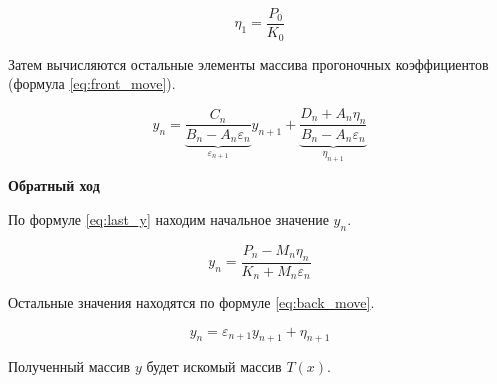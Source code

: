 \begin{equation}\label{eq:first_eta}
    \eta_1 = \frac{P_0}{K_0}
\end{equation}

Затем вычисляются остальные элементы массива прогоночных коэффициентов
(формула \ref{eq:front_move}).

\begin{equation}\label{eq:front_move}
    y_n =
    \underbrace{\frac{C_n}{B_n - A_n \varepsilon_n}}_{\varepsilon_{n+1}} y_{n+1} +
    \underbrace{\frac{D_n + A_n \eta_n}{B_n - A_n \varepsilon_n}}_{\eta_{n+1}}
\end{equation}

\textbf{Обратный ход}

По формуле \ref{eq:last_y} находим начальное значение $y_n$.

\begin{equation}\label{eq:last_y}
    y_n = \frac{P_n - M_n \eta_n}{K_n + M_n \varepsilon_n}
\end{equation}

Остальные значения находятся по формуле \ref{eq:back_move}.

\begin{equation}\label{eq:back_move}
    y_n = \varepsilon_{n+1} y_{n+1} + \eta_{n+1}
\end{equation}

Полученный массив $y$ будет искомый массив $T(x)$.
